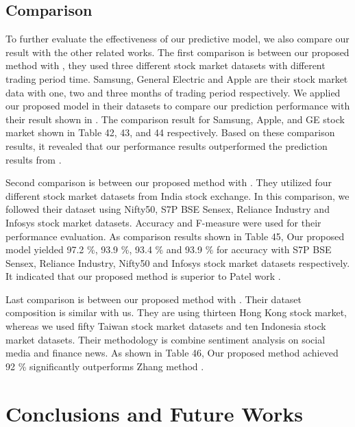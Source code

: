 \documentclass[10pt,twocolumn]{article}
\begin{document}
\subsection{Comparison}
To further evaluate the effectiveness of our predictive model, we also compare our result with the other related works. The first comparison is between our proposed method with \cite{khaidem2016predicting}, they used three different stock market datasets with different trading period time. Samsung, General Electric and Apple are their stock market data with one, two and three months of trading period respectively. We applied our proposed model in their datasets to compare our prediction performance with their result shown in \cite{khaidem2016predicting}. The comparison result for Samsung, Apple, and GE stock market shown in Table 42, 43, and 44 respectively. Based on these comparison results, it revealed that our performance results outperformed the prediction results from \cite{khaidem2016predicting}.
\par 
Second comparison is between our proposed method with \cite{patel2015predicting}. They utilized four different stock market datasets from India stock exchange. In this comparison, we followed their dataset using Nifty50, S7P BSE Sensex, Reliance Industry and Infosys stock market datasets. Accuracy and F-measure were used for their performance evaluation. As comparison results shown in Table 45, Our proposed model yielded 97.2 \%, 93.9 \%, 93.4 \% and 93.9 \% for accuracy with S7P BSE Sensex, Reliance Industry, Nifty50 and Infosys stock market datasets respectively. It indicated that our proposed method is superior to Patel work \cite{patel2015predicting}.
\par 
Last comparison is between our proposed method with \cite{zhang2018improving}. Their dataset composition is similar with us. They are using thirteen Hong Kong stock market, whereas we used fifty Taiwan stock market datasets and ten Indonesia stock market datasets. Their methodology is combine sentiment analysis on social media and finance news. As shown in Table 46, Our proposed method achieved 92 \% significantly outperforms Zhang method \cite{zhang2018improving}.
\section{Conclusions and Future Works}
\end{document}
